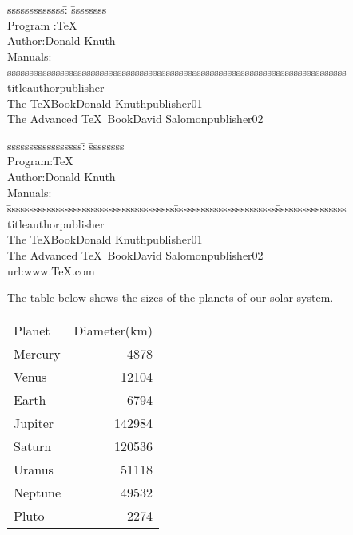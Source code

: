 \documentclass[a4paper, UTF8]{article}
\begin{document}
\begin{tabbing}
    sssssssssssss\=: \=ssssssss\kill\\[5pt]
    Program\> :\>\TeX\\[5pt]
    Author\>:\>Donald Knuth\\[5pt]
    Manuals\>:\\
    \quad\= ssssssssssssssssssssssssssssssssssssss\quad\=sssssssssssssssssssssss\=ssssssssssssssss\kill\\
        \>\textsf{title}\>\textsf{author}\>\textsf{publisher}\\[8pt]
        \>The \TeX Book\>Donald Knuth\>publisher01\\[5pt]
        \>The Advanced \TeX\ Book\>David Salomon\>publisher02
    
\end{tabbing}
\newpage

\begin{tabbing}
    sssssssssssssssss\=: \=ssssssss\kill\\[5pt]
    Program\>:\>\TeX\\[5pt]
    Author\>:\>Donald Knuth\\[5pt]
    Manuals\>:\\
    \pushtabs
    \quad\= ssssssssssssssssssssssssssssssssssssss\=sssssssssssssssssssssss\=ssssssssssssssss\kill\\
        \>\textsf{title}\>\textsf{author}\>\textsf{publisher}\\[8pt]
        \>The \TeX Book\>Donald Knuth\>publisher01\\[5pt]
        \>The Advanced \TeX\ Book\>David Salomon\>publisher02\\[16pt]
    \poptabs
    url\>:\>www.TeX.com
\end{tabbing}
\newpage

The table below shows the sizes of the planets of our solar system.
\begin{center}
    \begin{tabular}{lr}
        Planet  &   Diameter(km)\\[5pt]
        Mercury &   4878\\
        Venus   &   12104\\
        Earth   &   6794\\
        Jupiter &   142984\\
        Saturn  &   120536\\
        Uranus  &   51118\\
        Neptune &   49532\\
        Pluto   &   2274
    \end{tabular}
\end{center}
\end{document}
